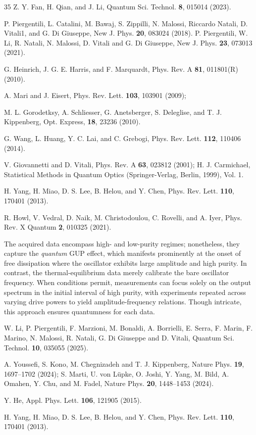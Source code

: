 \documentclass[aps,prl,twocolumn,superscriptaddress]{revtex4-2}
\begin{document}
\begin{thebibliography}{35}
 Z. Y. Fan, H. Qian, and J. Li, Quantum Sci. Technol. \textbf{8}, 015014 (2023). 

 P. Piergentili, L. Catalini, M. Bawaj, S. Zippilli, N. Malossi, Riccardo Natali, D. Vitali1, and G. Di Giuseppe, New J. Phys. \textbf{20}, 083024 (2018). P. Piergentili, W. Li, R. Natali, N. Malossi, D. Vitali and G. Di Giuseppe, New J. Phys. \textbf{23}, 073013 (2021).

 G. Heinrich, J. G. E. Harris, and F. Marquardt, Phys. Rev. A \textbf{81}, 011801(R) (2010).

 A. Mari and J. Eisert, Phys. Rev. Lett. \textbf{103}, 103901 (2009);

 M. L. Gorodetksy, A. Schliesser, G. Anetsberger, S. Deleglise, and T. J. Kippenberg, Opt. Express,  \textbf{18}, 23236 (2010).

 G. Wang, L. Huang, Y. C. Lai, and C. Grebogi, Phys. Rev. Lett. \textbf{112}, 110406 (2014).

 V. Giovannetti and D. Vitali, Phys. Rev. A \textbf{63}, 023812 (2001); H. J. Carmichael, Statistical Methods in Quantum Optics (Springer-Verlag, Berlin, 1999), Vol. 1.

 H. Yang, H. Miao, D. S. Lee, B. Helou, and Y. Chen, Phys. Rev. Lett. \textbf{110}, 170401 (2013).

 R. Howl, V. Vedral, D. Naik, M. Christodoulou, C. Rovelli, and A. Iyer, Phys. Rev. X Quantum \textbf{2}, 010325 (2021).

 The acquired data encompass high- and low-purity regimes; nonetheless, they capture the \textit{quantum} GUP effect, which manifests prominently at the onset of free dissipation where the oscillator exhibits large amplitude and high purity. In contrast, the thermal-equilibrium data merely calibrate the bare oscillator frequency. When conditions permit, measurements can focus solely on the output spectrum in the initial interval of high purity, with experiments repeated across varying drive powers to yield amplitude-frequency relations. Though intricate, this approach ensures quantumness for each data.

 W. Li, P. Piergentili, F. Marzioni, M. Bonaldi, A. Borrielli, E. Serra, F. Marin, F. Marino, N. Malossi, R. Natali, G. Di Giuseppe and D. Vitali, Quantum Sci. Technol. \textbf{10}, 035055 (2025).

  A. Youssefi, S. Kono, M. Chegnizadeh and T. J. Kippenberg, Nature Phys. \textbf{19}, 1697–1702 (2024); S. Marti, U. von L\"upke, O. Joshi, Y. Yang, M. Bild, A. Omahen, Y. Chu, and M. Fadel, Nature Phys. \textbf{20}, 1448–1453 (2024).

 Y. He, Appl. Phys. Lett. \textbf{106}, 121905 (2015).

 H. Yang, H. Miao, D. S. Lee, B. Helou, and Y. Chen, Phys. Rev. Lett. \textbf{110}, 170401 (2013).

\end{thebibliography}
\end{document}
